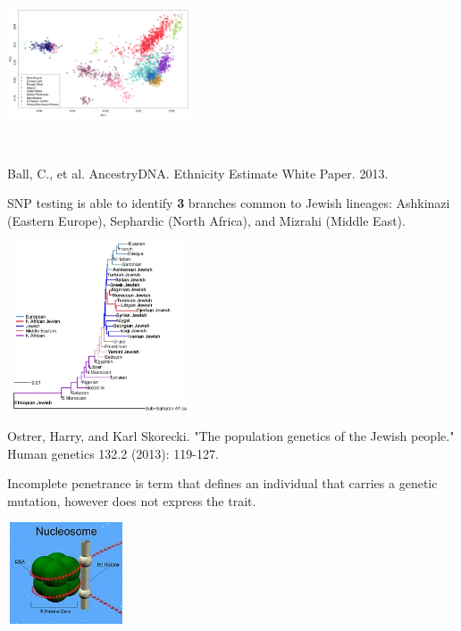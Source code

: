 \documentclass[hyperref,openany, oneside]{labbook} %
\begin{document}
\begin{center}
	\includegraphics[height=5cm, width=5.5cm]{kollel_1.png}\\
	\begin{tiny}
		Ball, C., et al. AncestryDNA. Ethnicity Estimate White Paper. 2013.
	\end{tiny}
\end{center}

SNP testing is able to identify \textbf{3} branches common to Jewish lineages: Ashkinazi (Eastern Europe), Sephardic (North Africa), and Mizrahi (Middle East). 

\begin{center}
	\includegraphics[height=5cm, width=5.5cm]{treejew.jpg}\\
	\begin{tiny}
		Ostrer, Harry, and Karl Skorecki. "The population genetics of the Jewish people." Human genetics 132.2 (2013): 119-127.
	\end{tiny}
\end{center}

\vspace{-0.3cm}
\vspace{-0.2cm}
Incomplete penetrance is term that defines an individual that carries a genetic mutation, however does not express the trait. 

\begin{center}
	\includegraphics[height=3cm, width=3.5cm]{Nucleosome.jpg}
\end{center}
\end{document}
